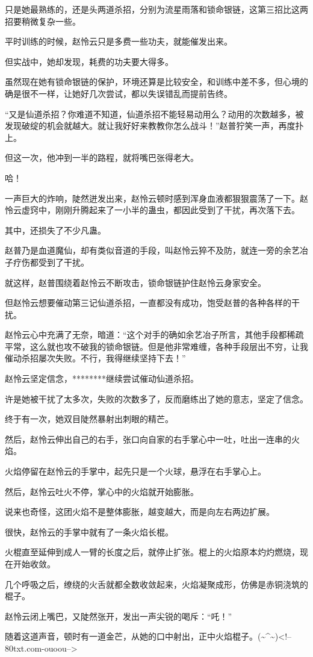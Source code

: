 \begin{this_body}
只是她最熟练的，还是头两道杀招，分别为流星雨落和锁命银链，这第三招比这两招要稍微复杂一些。

平时训练的时候，赵怜云只是多费一些功夫，就能催发出来。

但实战中，她却发现，耗费的功夫要大得多。

虽然现在她有锁命银链的保护，环境还算是比较安全，和训练中差不多，但心境的确是很不一样，让她好几次尝试，都以失误错乱而提前告终。

“又是仙道杀招？你难道不知道，仙道杀招不能轻易动用么？动用的次数越多，被发现破绽的机会就越大。就让我好好来教教你怎么战斗！”赵普狞笑一声，再度扑上。

但这一次，他冲到一半的路程，就将嘴巴张得老大。

哈！

一声巨大的炸响，陡然迸发出来，赵怜云顿时感到浑身血液都狠狠震荡了一下。赵怜云虚窍中，刚刚升腾起来了一小半的蛊虫，都因此受到了干扰，再次落下去。

其中，还损失了不少凡蛊。

赵普乃是血道魔仙，却有类似音道的手段，叫赵怜云猝不及防，就连一旁的余艺冶子疗伤都受到了干扰。

就这样，赵普围绕着赵怜云不断攻击，锁命银链护住赵怜云身家安全。

但赵怜云想要催动第三记仙道杀招，一直都没有成功，饱受赵普的各种各样的干扰。

赵怜云心中充满了无奈，暗道：“这个对手的确如余艺冶子所言，其他手段都稀疏平常，这么就也攻不破我的锁命银链。但是他非常难缠，各种手段层出不穷，让我催动杀招屡次失败。不行，我得继续坚持下去！”

赵怜云坚定信念，********继续尝试催动仙道杀招。

许是她被干扰了太多次，失败的次数多了，反而磨练出了她的意志，坚定了信念。

终于有一次，她双目陡然暴射出刺眼的精芒。

然后，赵怜云伸出自己的右手，张口向自家的右手掌心中一吐，吐出一连串的火焰。

火焰停留在赵怜云的手掌中，起先只是一个火球，悬浮在右手掌心上。

然后，赵怜云吐火不停，掌心中的火焰就开始膨胀。

说来也奇怪，这团火焰不是整体膨胀，越变越大，而是向左右两边扩展。

很快，赵怜云的手掌中就有了一条火焰长棍。

火棍直至延伸到成人一臂的长度之后，就停止扩张。棍上的火焰原本灼灼燃烧，现在开始收敛。

几个呼吸之后，缭绕的火舌就都全数收敛起来，火焰凝聚成形，仿佛是赤铜浇筑的棍子。

赵怜云闭上嘴巴，又陡然张开，发出一声尖锐的喝斥：“吒！”

随着这道声音，顿时有一道金芒，从她的口中射出，正中火焰棍子。(\~{}\^{}\~{})<!--80txt.com-ouoou-->

\end{this_body}

